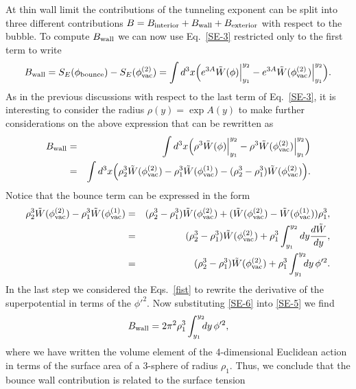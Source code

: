 \documentclass[aps,12pt, a4paper,nofootinbib]{revtex4}
\begin{document}
{At thin wall limit the contributions of the tunneling exponent can be split into three different contributions \cite{Masoumi:2017vip} $B=B_{\rm interior}+B_{\rm wall}+B_{\rm exterior}$ with respect to the bubble. To compute $B_{\rm wall}$ we can now use Eq.~\eqref{SE-3} restricted only to the first term to write 
\begin{eqnarray}\label{SE-4}
B_{\rm wall}=S_E(\phi_{\rm bounce})-S_E(\phi^{(2)}_{\rm vac})=\int d^{3}x\Big(e^{3A}\tilde{W}({\phi})\Big{|}_{y_1}^{y_2}-e^{3A}\tilde{W}(\phi^{(2)}_{\rm vac})\Big{|}_{y_1}^{y_2}\Big).
\end{eqnarray}
As in the previous discussions with respect to the last term of  Eq.~\eqref{SE-3}, it is interesting to consider the radius $\rho(y)=\exp A(y)$ to make further considerations on the above expression that can be rewritten as
\begin{eqnarray}\label{SE-5}
B_{\rm wall}&=&\int d^{3}x\Big(\rho^{3}\tilde{W}({\phi})\Big{|}_{y_1}^{y_2}-\rho^{3}\tilde{W}(\phi^{(2)}_{\rm vac})\Big{|}_{y_1}^{y_2}\Big)\nonumber\\
&=&\int d^{3}x\Big(\rho_2^{3}\tilde{W}(\phi^{(2)}_{\rm vac})-\rho_1^{3}\tilde{W}(\phi^{(1)}_{\rm vac})-(\rho_2^{3}-\rho_1^{3})\tilde{W}(\phi^{(2)}_{\rm vac})\Big).
\end{eqnarray}
Notice that the bounce term can be expressed in the form
\begin{eqnarray}\label{SE-6}
\rho_2^{3}\tilde{W}(\phi^{(2)}_{\rm vac})-\rho_1^{3}\tilde{W}(\phi^{(1)}_{\rm vac})&=&(\rho_2^3-\rho_1^3)\tilde{W}(\phi^{(2)}_{\rm vac})+(\tilde{W}(\phi^{(2)}_{\rm vac})-\tilde{W}(\phi^{(1)}_{\rm vac}))\rho_1^3,\nonumber\\
&=&(\rho_2^3-\rho_1^3)\tilde{W}(\phi^{(2)}_{\rm vac})+\rho_1^3\int_{y_1}^{y_2}{dy\frac{d\tilde{W}}{dy}},\nonumber\\
&=&(\rho_2^3-\rho_1^3)\tilde{W}(\phi^{(2)}_{\rm vac})+\rho_1^3\int_{y_1}^{y_2}{\!\!\!dy\, \phi'^2}.
\end{eqnarray}
In the last step we considered the Eqs.~\eqref{fist} to rewrite the derivative of the superpotential in terms of the $\phi'^2$. Now substituting \eqref{SE-6} into \eqref{SE-5} we find 
\begin{eqnarray}\label{SE-7}
B_{\rm wall}=2\pi^2\rho_1^3\int_{y_1}^{y_2}{\!\!\!dy\, \phi'^2},
\end{eqnarray}
where we have written the volume element  of the 4-dimensional Euclidean action in terms of the surface area of a  3-sphere of radius $\rho_1$. Thus, we conclude that the bounce wall contribution is related to the surface tension 
}
\end{document}
